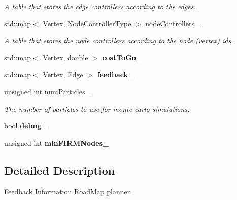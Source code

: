 \begin{DoxyCompactItemize}
\begin{DoxyCompactList}\small\item\em \-A table that stores the edge controllers according to the edges. \end{DoxyCompactList}\item 
\hypertarget{class_f_i_r_m_ac80211b920fb34ee04779c9af2c0d1c4}{std\-::map$<$ \-Vertex, \*
\hyperlink{class_controller}{\-Node\-Controller\-Type} $>$ \hyperlink{class_f_i_r_m_ac80211b920fb34ee04779c9af2c0d1c4}{node\-Controllers\-\_\-}}\label{class_f_i_r_m_ac80211b920fb34ee04779c9af2c0d1c4}

\begin{DoxyCompactList}\small\item\em \-A table that stores the node controllers according to the node (vertex) ids. \end{DoxyCompactList}\item 
\hypertarget{class_f_i_r_m_a2da49edf6ea58f4116cd3c31022bd693}{std\-::map$<$ \-Vertex, double $>$ {\bfseries cost\-To\-Go\-\_\-}}\label{class_f_i_r_m_a2da49edf6ea58f4116cd3c31022bd693}

\item 
\hypertarget{class_f_i_r_m_aae9e2e83177ef121adc36ef7f9e5d16d}{std\-::map$<$ \-Vertex, \-Edge $>$ {\bfseries feedback\-\_\-}}\label{class_f_i_r_m_aae9e2e83177ef121adc36ef7f9e5d16d}

\item 
\hypertarget{class_f_i_r_m_a17cff52eb2c31715ab8341b9daea1a3f}{unsigned int \hyperlink{class_f_i_r_m_a17cff52eb2c31715ab8341b9daea1a3f}{num\-Particles\-\_\-}}\label{class_f_i_r_m_a17cff52eb2c31715ab8341b9daea1a3f}

\begin{DoxyCompactList}\small\item\em \-The number of particles to use for monte carlo simulations. \end{DoxyCompactList}\item 
\hypertarget{class_f_i_r_m_a7fc88496b950b90b92876dea03b3102f}{bool {\bfseries debug\-\_\-}}\label{class_f_i_r_m_a7fc88496b950b90b92876dea03b3102f}

\item 
\hypertarget{class_f_i_r_m_add9de6c5accdea0f9b6d1ff458350036}{unsigned int {\bfseries min\-F\-I\-R\-M\-Nodes\-\_\-}}\label{class_f_i_r_m_add9de6c5accdea0f9b6d1ff458350036}

\end{DoxyCompactItemize}


\subsection{\-Detailed \-Description}
\-Feedback \-Information \-Road\-Map planner. 

